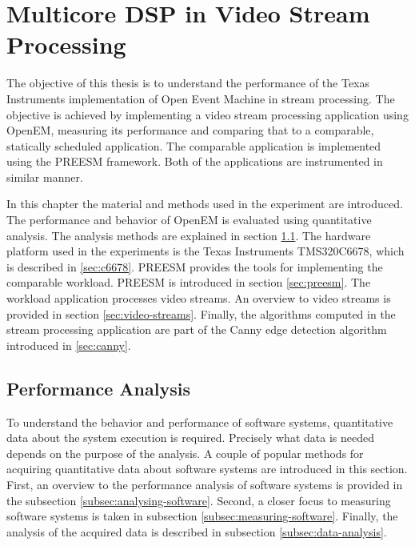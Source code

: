 \chapter{Multicore DSP in Video Stream Processing}
\label{chapter:experiments}
The objective of this thesis is to understand the performance of the Texas Instruments implementation of Open Event Machine in stream processing. The objective is achieved by implementing a video stream processing application using OpenEM, measuring its performance and comparing that to a comparable, statically scheduled application. The comparable application is implemented using the PREESM framework. Both of the applications are instrumented in similar manner.

In this chapter the material and methods used in the experiment are introduced. The performance and behavior of OpenEM is evaluated using quantitative analysis. The analysis methods are explained in section \ref{sec:performance-analysis}. The hardware platform used in the experiments is the Texas Instruments TMS320C6678, which is described in \ref{sec:c6678}. PREESM provides the tools for implementing the comparable workload. PREESM is introduced in section \ref{sec:preesm}. The workload application processes video streams. An overview to video streams is provided in section \ref{sec:video-streams}. Finally, the algorithms computed in the stream processing application are part of the Canny edge detection algorithm introduced in \ref{sec:canny}.

\section{Performance Analysis}
\label{sec:performance-analysis}
To understand the behavior and performance of software systems, quantitative data about the system execution is required. Precisely what data is needed depends on the purpose of the analysis. A couple of popular methods for acquiring quantitative data about software systems are introduced in this section. First, an overview to the performance analysis of software systems is provided in the subsection \ref{subsec:analysing-software}. Second, a closer focus to measuring software systems is taken in subsection \ref{subsec:measuring-software}. Finally, the analysis of the acquired data is described in subsection \ref{subsec:data-analysis}.

